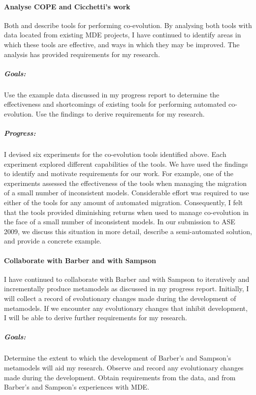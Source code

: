 \paragraph{Analyse COPE and Cicchetti's work} %
\label{par:analyse_existing_work}
Both \cite{herrmannsdoerfer08cope} and \cite{cicchetti08automating} describe tools for performing co-evolution. By analysing both tools with data located from existing MDE projects, I have continued to identify areas in which these tools are effective, and ways in which they may be improved. The analysis has provided requirements for my research.

\subparagraph{Goals:} Use the example data discussed in my progress report to determine the effectiveness and shortcomings of existing tools for performing automated co-evolution. Use the findings to derive requirements for my research.

\subparagraph{Progress:} I devised six experiments for the co-evolution tools identified above. Each experiment explored different capabilities of the tools. We have used the findings to identify and motivate requirements for our work. For example, one of the experiments assessed the effectiveness of the tools when managing the migration of a small number of inconsistent models. Considerable effort was required to use either of the tools for any amount of automated migration. Consequently, I felt that the tools provided diminishing returns when used to manage co-evolution in the face of a small number of inconsistent models. In our submission to ASE 2009, we discuss this situation in more detail, describe a semi-automated solution, and provide a concrete example.



\paragraph{Collaborate with Barber and with Sampson} %
\label{par:collaborate_with_barber_and_with_sampson}
I have continued to collaborate with Barber and with Sampson to iteratively and incrementally produce metamodels as discussed in my progress report. Initially, I will collect a record of evolutionary changes made during the development of metamodels. If we encounter any evolutionary changes that inhibit development, I will be able to derive further requirements for my research.

\subparagraph{Goals:} Determine the extent to which the development of Barber's and Sampson's metamodels will aid my research. Observe and record any evolutionary changes made during the development. Obtain requirements from the data, and from Barber's and Sampson's experiences with MDE.

